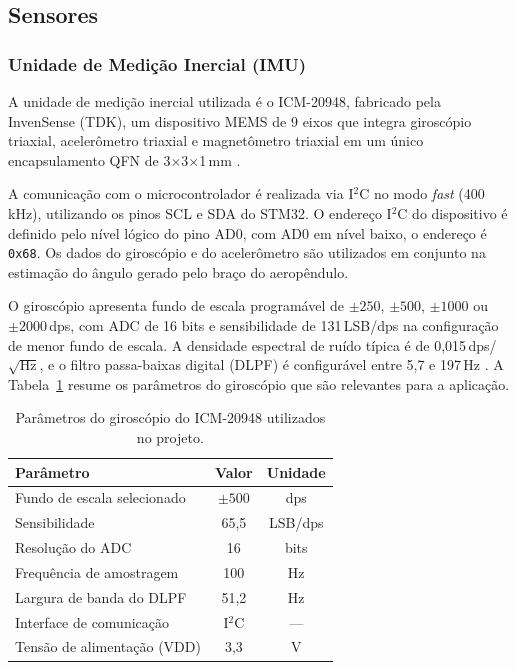 \subsection{Sensores}

\subsubsection{Unidade de Medição Inercial (IMU)}

A unidade de medição inercial utilizada é o ICM-20948, fabricado pela InvenSense (TDK), um dispositivo MEMS de 9 eixos que integra giroscópio triaxial, acelerômetro triaxial e magnetômetro triaxial em um único encapsulamento QFN de 3$\times$3$\times$1\,mm \cite{invensense2021icm20948}.

A comunicação com o microcontrolador é realizada via I$^2$C no modo \textit{fast} (400\,kHz), utilizando os pinos SCL e SDA do STM32. O endereço I$^2$C do dispositivo é definido pelo nível lógico do pino AD0, com AD0 em nível baixo, o endereço é \texttt{0x68}. Os dados do giroscópio e do acelerômetro são utilizados em conjunto na estimação do ângulo gerado pelo braço do aeropêndulo.

O giroscópio apresenta fundo de escala programável de $\pm250$, $\pm500$, $\pm1000$ ou $\pm2000$\,dps, com ADC de 16 bits e sensibilidade de 131\,LSB/dps na configuração de menor fundo de escala. A densidade espectral de ruído típica é de 0,015\,dps/$\sqrt{\text{Hz}}$, e o filtro passa-baixas digital (DLPF) é configurável entre 5,7 e 197\,Hz \cite{invensense2021icm20948}. A Tabela~\ref{tab:icm_gyro} resume os parâmetros do giroscópio que são relevantes para a aplicação.

\begin{table}[h]
    \centering
    \caption{Parâmetros do giroscópio do ICM-20948 utilizados no projeto.}
    \label{tab:icm_gyro}
    \begin{tabular}{lcc}
        \hline
        \textbf{Parâmetro} & \textbf{Valor} & \textbf{Unidade} \\
        \hline
        Fundo de escala selecionado & $\pm500$ & dps \\
        Sensibilidade                & 65,5   & LSB/dps \\
        Resolução do ADC             & 16     & bits \\
        Frequência de amostragem     & 100    & Hz \\
        Largura de banda do DLPF     & 51,2   & Hz \\
        Interface de comunicação     & I$^2$C & --- \\
        Tensão de alimentação (VDD)  & 3,3    & V \\
        \hline
    \end{tabular}
\end{table}

